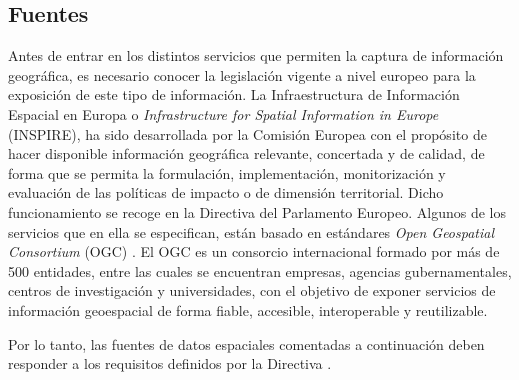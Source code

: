 \subsection{Fuentes} \label{sec:fuentes}

Antes de entrar en los distintos servicios que permiten la captura de información geográfica, es necesario conocer la legislación vigente a nivel europeo para la exposición de este tipo de información.
La Infraestructura de Información Espacial en Europa o \textit{Infrastructure for Spatial Information in Europe} (INSPIRE), 
ha sido desarrollada por la Comisión Europea con el propósito de hacer disponible información geográfica relevante, concertada y de calidad,
de forma que se permita la formulación, implementación, monitorización y evaluación de las políticas de impacto o de dimensión territorial.
Dicho funcionamiento se recoge en la Directiva \cite{directiva-INSPIRE} del Parlamento Europeo.
Algunos de los servicios que en ella se especifican, están basado en estándares \textit{Open Geospatial Consortium} (OGC) \cite{OGC}.
El OGC es un consorcio internacional formado por más de 500 entidades, entre las cuales se encuentran empresas, agencias gubernamentales, centros de investigación y universidades, 
con el objetivo de exponer servicios de información geoespacial de forma fiable, accesible, interoperable y reutilizable.

Por lo tanto, las fuentes de datos espaciales comentadas a continuación deben responder a los requisitos definidos por la Directiva \cite{directiva-INSPIRE}. 

